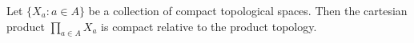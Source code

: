 Let $\{X_a : a \in A\}$ be a collection of compact topological spaces. Then the cartesian product $\prod_{a \in A} X_a$ is compact relative to the product topology.
